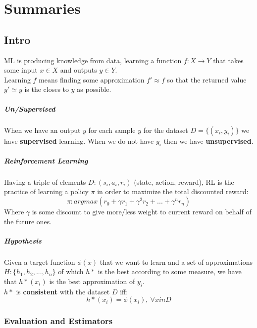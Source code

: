 
\newcommand{\braces}[1]{\lbrace{#1}\rbrace}

\chapter{Summaries}
\section{Intro}

ML is producing knowledge from data, learning a function $f:X\rightarrow Y$ that takes some input $x \in X$ and outputs $y \in Y$.\\
Learning $f$ means finding some approximation $f' \approx f$ so that the returned value $y' \simeq y$ is the closes to $y$ as possible.\\

\paragraph{Un/Supervised}  When we have an output $y$ for each sample $y$ for the dataset $D=\lbrace (x_i,y_i)\rbrace$ we have \textbf{supervised } learning. When we do not have $y_i$ then we have \textbf{unsupervised}.

\paragraph{Reinforcement Learning}
Having a triple of elements $D: (s_i,a_i,r_i)$ (state, action, reward), RL is the practice of learning a policy $\pi$ in order to maximize the total discounted reward:
\[\pi: argmax(r_0+ \gamma r_1+ \gamma^2 r_2+...+\gamma^n r_n)\]
Where $\gamma$ is some discount to give more/less weight to current reward on behalf of the future ones.

\paragraph{Hypothesis}
Given a target function $\phi(x)$ that we want to learn and a set of approximations $H:\lbrace h_1, h_2,...,h_n\rbrace$ of which $h*$ is the best according to some measure, we have that $h*(x_i)$ is the best approximation of $y_i$.\\
$h*$ is \textbf{consistent} with the dataset $D$ iff:
$$h*(x_i)= \phi(x_i),\ \forall x in D$$

\subsection{Evaluation and Estimators}

